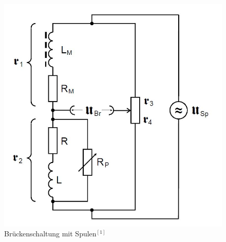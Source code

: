 	\begin{figure}[h]
		\begin{center}
		\includegraphics[scale=0.3]{picbrucke.jpg}
		\caption{Brückenschaltung mit Spulen$^{[1]}$}
		\label{picbrucke}
		\end{center}	
	\end{figure}